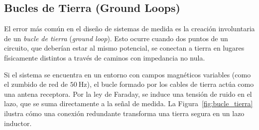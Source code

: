 \begin{marginfigure}
    \centering
    \caption[Esquema de tierra en estrella.]{Conexión de tierra de punto único. Cada módulo tiene un camino radial hacia la masa, evitando que las corrientes de retorno se mezclen antes de llegar al punto central.}\label{fig:tierra_estrella}
\end{marginfigure}

\subsection{Bucles de Tierra (Ground Loops)}\label{sub:ground_loops}

El error más común en el diseño de sistemas de medida es la creación involuntaria de un \emph{bucle de tierra} (\textit{ground loop}). Esto ocurre cuando dos puntos de un circuito, que deberían estar al mismo potencial, se conectan a tierra en lugares físicamente distintos a través de caminos con impedancia no nula.

Si el sistema se encuentra en un entorno con campos magnéticos variables (como el zumbido de red de $\SI{50}{\hertz}$), el bucle formado por los cables de tierra actúa como una antena receptora. Por la ley de Faraday, se induce una tensión de ruido en el lazo, que se suma directamente a la señal de medida. La Figura~\ref{fig:bucle_tierra} ilustra cómo una conexión redundante transforma una tierra segura en un lazo inductor.

